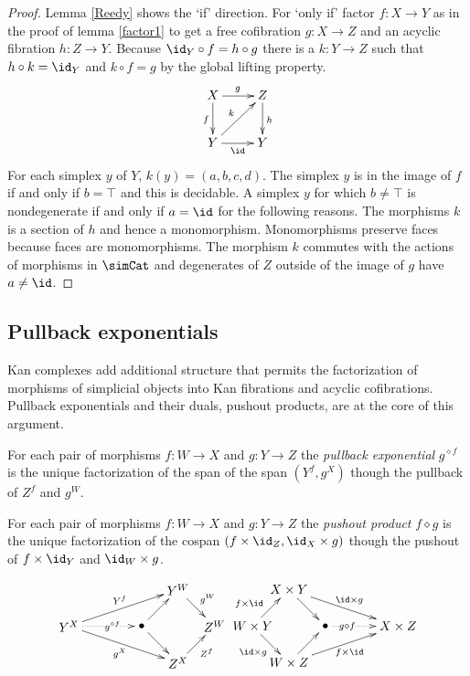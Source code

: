 \documentclass{tac}
\newcommand\hide[1]{}
\newcommand\of{:}
\newcommand\pe[1]{^{\diamond #1}}
\newcommand\pp{\mathbin\diamond}
\begin{document}
\begin{proof} Lemma \ref{Reedy} shows the `if' direction. For `only if' factor $f\of X\to Y$ as in the proof of lemma \ref{factor1} to get a free cofibration $g\of X\to Z$ and an acyclic fibration $h\of Z\to Y$. Because $\id_Y\circ f = h\circ g$ there is a $k\of Y\to Z$ such that $h\circ k = \id_Y$ and $k\circ f = g$ by the global lifting property. 
\[
\xymatrix{
X\ar[d]_f \ar[r]^g & Z\ar[d]^h\\
Y\ar[r]_\id \ar[ur]^k & Y
}
\]
For each simplex $y$ of $Y$, $k(y)=(a,b,c,d)$. The simplex $y$ is in the image of $f$ if and only if $b=\top$ and this is decidable. A simplex $y$ for which $b\neq \top$ is nondegenerate if and only if $a=\id$ for the following reasons. The morphisms $k$ is a section of $h$ and hence a monomorphism. Monomorphisms preserve faces because faces are monomorphisms. The morphism $k$ commutes with the actions of morphisms in $\simCat$ and degenerates of $Z$ outside of the image of $g$ have $a\neq\id$.
\end{proof}

\subsection{Pullback exponentials}
Kan complexes add additional structure that permits the factorization of morphisms of simplicial objects into Kan fibrations and acyclic cofibrations. Pullback exponentials and their duals, pushout products, are at the core of this argument.

\begin{definition} For each pair of morphisms $f\of W\to X$ and $g\of Y\to Z$ the \emph{pullback exponential} $g\pe f$ is the unique factorization of the span of the span $(Y^f, g^X)$ though the pullback of $Z^f$ and $g^W$. 
\hide{\[\xymatrix{
Y^X \ar@/^2ex/[rr]^{Y^f} \ar[dr]_{g^X} \ar@{.>}[r]_(.6){g\pe f}
& \bullet \ar[r]\ar[d] & Y^W \ar[d]^{g^W} \\
& Z^X \ar[r]_{Z^f} & Z^W
}\]}

For each pair of morphisms $f\of W\to X$ and $g\of Y\to Z$ the \emph{pushout product} $f\pp g$ is the unique factorization of the cospan $(f\times \id_Z , \id_X\times g)$ though the pushout of $f\times \id_Y$ and $\id_W\times g$. 
\hide{\[\xymatrix{
W\times Y \ar[r]^{f\times \id} \ar[d]_{\id\times g} \po & X\times Y \ar[d] \ar[dr]^{\id\times g} \\
W\times Z \ar[r] \ar@/_2ex/[rr]_{f\times\id} & \bullet \ar[r]^(.4){f\pp g} & X\times Z
}\]}
\[\xy
(0,10)*+{Y^X}="left",(20,10)*+{\bullet}="middle",(30,20)*+{Y^W}="top",(30,0)*+{Z^X}="bottom",(40,10)*+{Z^W}="right"
\ar^{Y^f} "left";"top" \ar_{g^X} "left";"bottom" \ar@{.>}|(.6){g\pe f} "left";"middle" 
\ar "middle";"top" \ar "middle";"bottom" \ar^{g^W} "top";"right" \ar_{Z^f} "bottom";"right"
\endxy\xy
(0,10)*+{W\times Y}="left",(20,10)*+{\bullet}="middle",(10,20)*+{X\times Y}="top",(10,0)*+{W\times Z}="bottom",(40,10)*+{X\times Z}="right"
\ar^(.4){f\times \id} "left";"top" \ar_{\id\times g} "left";"bottom" \ar "top";"middle" \ar "bottom";"middle"
\ar@{.>}|(.3){g\pp f} "middle";"right" \ar^{\id\times g} "top";"right" \ar_{f\times\id} "bottom";"right"
\endxy\]

\end{definition}
\end{document}
